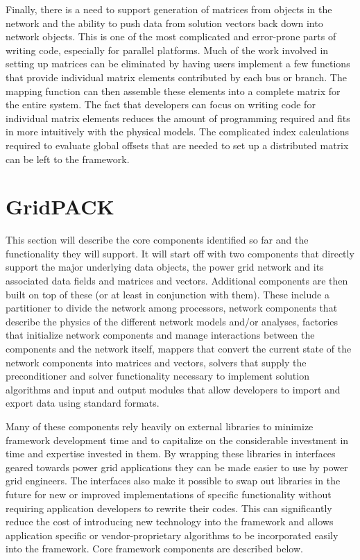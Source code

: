 \documentclass{acm_proc_article-sp}
\begin{document}
Finally, there is a need to support generation of matrices from objects in the
network and the ability to push data from solution vectors back down into
network objects. This is one of the most complicated and error-prone parts of
writing code, especially for parallel platforms. Much of the work involved in
setting up matrices can be eliminated by having users implement a few functions
that provide individual matrix elements contributed by each bus or branch. The
mapping function can then assemble these elements into a complete matrix for the
entire system. The fact that developers can focus on writing code for individual
matrix elements reduces the amount of programming required and fits in more
intuitively with the physical models. The complicated index calculations
required to evaluate global offsets that are needed to set up a distributed
matrix can be left to the framework.

\section{GridPACK\texttrademark}
This section will describe the core components identified so far and the functionality they
will support. It will start off with two components that directly support the major
underlying data objects, the power grid network and its associated data fields and matrices
and vectors. Additional components are then built on top of these (or at least in
conjunction with them). These include a partitioner to divide the network among
processors, network components that describe the physics of the different network
models and/or
analyses, factories that initialize network components and manage interactions
between the components and the network itself, mappers that
convert the current state of the network components into matrices and vectors,
solvers that supply the preconditioner and solver
functionality necessary to implement solution algorithms and input and output modules that
allow developers to import and export data using standard formats.

Many of these components rely heavily on external libraries to minimize
framework development time and to capitalize on the considerable investment in
time and expertise invested in them. By wrapping these libraries in interfaces geared
towards power grid applications they can be made easier to use by power grid
engineers. The interfaces also make it possible to swap out libraries in the future for new
or improved implementations of specific functionality without requiring application
developers to rewrite their codes. This can significantly reduce the cost of introducing
new technology into the framework and allows application specific or
vendor-proprietary algorithms to be incorporated easily into the framework.
Core framework components are described below.
\end{document}
